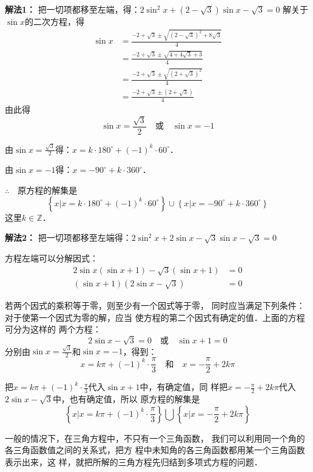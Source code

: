 \begin{solution}
\textbf{解法1：} 把一切项都移至左端，得：$2\sin^2x+\left(2-\sqrt{3}\right)\sin x-\sqrt{3}=0$
解关于$\sin x$的二次方程，得
\[\begin{split}
\sin x&=\frac{-2+\sqrt{3}\pm \sqrt{\left(2-\sqrt{3}\right)^2+8\sqrt{3}}}{4}\\
&=\frac{-2+\sqrt{3}\pm \sqrt{4+4\sqrt{3}+3}}{4}\\
&=\frac{-2+\sqrt{3}\pm \sqrt{\left(2+\sqrt{3}\right)^2}}{4}\\
&=\frac{-2+\sqrt{3}\pm \left(2+\sqrt{3}\right)}{4}
\end{split}\]
由此得
\[\sin x=\frac{\sqrt{3}}{2}\quad \text{或}\quad \sin x=-1\]

由$\sin x=\frac{\sqrt{3}}{2}$得：$x=k\cdot 180^{\circ}+(-1)^k\cdot 60^{\circ}$．

由$\sin x=-1$得：$x=-90^{\circ}+k\cdot 360^{\circ}$．

$\therefore\quad $原方程的解集是
\[\left\{x|x=k\cdot 180^{\circ}+(-1)^k\cdot 60^{\circ}\right\}\cup \left\{x|x=-90^{\circ}+k\cdot 360^{\circ}\right\}\]
这里$k\in\mathbb{Z}$．

\textbf{解法2：} 把一切项都移至左端得：$2\sin^2x+2\sin x-\sqrt{3}\sin x-\sqrt{3}=0$

方程左端可以分解因式：
\[\begin{split}
    2\sin x(\sin x+1)-\sqrt{3}(\sin x+1)&=0\\
    (\sin x+1)\left(2\sin x-\sqrt{3}\right)&=0
\end{split}\]

若两个因式的乘积等于零，则至少有一个因式等于零，
同时应当满足下列条件：对于使第一个因式为零的解，应当
使方程的第二个因式有确定的值．上面的方程可分为这样的
两个方程：
\[2\sin x-\sqrt{3}=0\quad \text{或}\quad \sin x+1=0\]
分别由$\sin x=\frac{\sqrt{3}}{2} $和$\sin x=-1$，得到：
\[x=k\pi+(-1)^k \cdot\frac{\pi}{3}\quad \text{和}\quad x=-\frac{\pi}{2}+2k\pi\]

把$x=k\pi+(-1)^k \cdot\frac{\pi}{3}$代入$\sin x+1$中，有确定值，同
样把$x=-\frac{\pi}{2}+2k\pi$代入$2\sin x-\sqrt{3}$中，也有确定值，所以
原方程的解集是
\[\left\{x\Big|x=k\pi+(-1)^k \cdot\frac{\pi}{3}\right\}\bigcup \left\{x\Big|x=-\frac{\pi}{2}+2k\pi\right\}\]
\end{solution}

一般的情况下，在三角方程中，不只有一个三角函数，
我们可以利用同一个角的各三角函数值之间的关系式，把方
程中未知角的各三角函数都用某一个三角函数表示出来，这
样，就把所解的三角方程先归结到多项式方程的问题．

